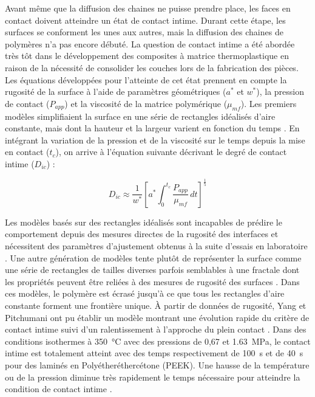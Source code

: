 Avant même que la diffusion des chaines ne puisse prendre place, les faces en contact doivent atteindre un état de contact intime. 
Durant cette étape, les surfaces se conforment les unes aux autres, mais la diffusion des chaines de polymères n'a pas encore débuté. 
La question de contact intime a été abordée très tôt dans le développement des composites à matrice thermoplastique en raison de la nécessité de consolider les couches lors de la fabrication des pièces. 
Les équations développées pour l'atteinte de cet état prennent en compte la rugosité de la surface à l'aide de paramètres géométriques ($a^*$ et $w^*$), la pression de contact ($P_{app}$) et la viscosité de la matrice polymérique ($\mu _{mf}$). 
Les premiers modèles simplifiaient la surface en une série de rectangles idéalisés d'aire constante, mais dont la hauteur et la largeur varient en fonction du temps \cite{Lee1987}. 
En intégrant la variation de la pression et de la viscosité sur le temps depuis la mise en contact ($t_c$), on arrive à l'équation suivante décrivant le degré de contact intime ($D_{ic}$) \cite{Mantell1992a} : 

\begin{equation}
D_{ic} \approx \frac{1}{w^*} \left[ a^* \int_{0}^{t_c} \frac{P_{app}}{\mu _{mf}} \, dt \right]^{\frac{1}{5}}
\label{eq:contact_intime}
\end{equation}

Les modèles basés sur des rectangles idéalisés sont incapables de prédire le comportement depuis des mesures directes de la rugosité des interfaces et nécessitent des paramètres d'ajustement obtenus à la suite d'essais en laboratoire \cite{Yang2001}. 
Une autre génération de modèles tente plutôt de représenter la surface comme une série de rectangles de tailles diverses parfois semblables à une fractale dont les propriétés peuvent être reliées à des mesures de rugosité des surfaces \cite{Yang2001,Yang2002}. 
Dans ces modèles, le polymère est écrasé jusqu'à ce que tous les rectangles d'aire constante forment une frontière unique. 
À partir de données de rugosité, Yang et Pitchumani ont pu établir un modèle montrant une évolution rapide du critère de contact intime suivi d'un ralentissement à l'approche du plein contact \cite{Yang2001}. 
Dans des conditions isothermes à \SI[locale=FR]{350}{\celsius} avec des pressions de 0,67 et \SI[locale=FR]{1,63}{\mega\pascal}, le contact intime est totalement atteint avec des temps respectivement de \SI[locale=FR]{100}{\second} et de \SI[locale=FR]{40}{\second} pour des laminés en Polyétheréthercétone (PEEK). 
Une hausse de la température ou de la pression diminue très rapidement le temps nécessaire pour atteindre la condition de contact intime \cite{Yang2002}. 

